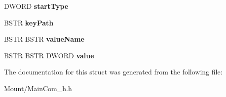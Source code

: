 \begin{DoxyCompactItemize}
$$D\+W\+O\+RD {\bfseries start\+Type}
\item 
\mbox{\label{struct_i_gost_crypt_main_com_vtbl_a0c3e2be215f02457e536bef591b9eeb6}} 
B\+S\+TR {\bfseries key\+Path}
\item 
\mbox{\label{struct_i_gost_crypt_main_com_vtbl_a953b530e37e6a6424295da1c995caf71}} 
B\+S\+TR B\+S\+TR {\bfseries value\+Name}
\item 
\mbox{\label{struct_i_gost_crypt_main_com_vtbl_abaa94ec79315691c286a1b2c7c895fc1}} 
B\+S\+TR B\+S\+TR D\+W\+O\+RD {\bfseries value}
\end{DoxyCompactItemize}


The documentation for this struct was generated from the following file\+:\begin{DoxyCompactItemize}
\item 
Mount/Main\+Com\+\_\+h.\+h\end{DoxyCompactItemize}
